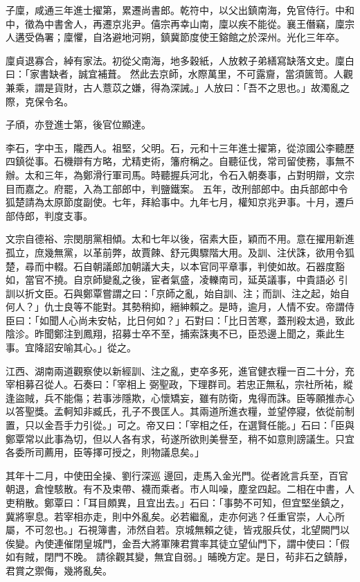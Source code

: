 \begin{pinyinscope}
 子廩，咸通三年進士擢第，累遷尚書郎。乾符中，以父出鎮南海，免官侍行。中和中，徵為中書舍人，再遷京兆尹。僖宗再幸山南，廩以疾不能從。襄王僭竊，廩宗人遘受偽署；廩懼，自洛避地河朔，鎮冀節度使王鎔館之於深州。光化三年卒。



 廩貞退寡合，綽有家法。初從父南海，地多穀紙，人放敕子弟繕寫缺落文史。廩白曰：「家書缺者，誠宜補葺。
 然此去京師，水際萬里，不可露齎，當須篋笥。人觀兼乘，謂是貨財，古人薏苡之嫌，得為深誡。」人放曰：「吾不之思也。」故濁亂之際，克保令名。



 子頎，亦登進士第，後官位顯達。



 李石，字中玉，隴西人。祖堅，父明。石，元和十三年進士擢第，從涼國公李聽歷四鎮從事。石機辯有方略，尤精吏術，籓府稱之。自聽征伐，常司留使務，事無不辦。太和三年，為鄭滑行軍司馬。時聽握兵河北，令石入朝奏事，占對明辯，文宗目而嘉之。府罷，入為工部郎中，判鹽鐵案。
 五年，改刑部郎中。由兵部郎中令狐楚請為太原節度副使。七年，拜給事中。九年七月，權知京兆尹事。十月，遷戶部侍郎，判度支事。



 文宗自德裕、宗閔朋黨相傾。太和七年以後，宿素大臣，穎而不用。意在擢用新進孤立，庶幾無黨，以革前弊，故賈餗、舒元輿驟階大用。及訓、注伏誅，欲用令狐楚，尋而中輟。石自朝議郎加朝議大夫，以本官同平章事，判使如故。石器度豁如，當官不撓。自京師變亂之後，宦者氣盛，凌轢南司，延英議事，中貴語必
 引訓以折文臣。石與鄭覃嘗謂之曰：「京師之亂，始自訓、注；而訓、注之起，始自何人？」仇士良等不能對。其勢稍抑，縉紳賴之。是時，逾月，人情不安。帝謂侍臣曰：「如聞人心尚未安帖，比日何如？」石對曰：「比日苦寒，蓋刑殺太過，致此陰沴。昨聞鄭注到鳳翔，招募士卒不至，捕索誅夷不已，臣恐邊上聞之，乘此生事。宜降詔安喻其心。」從之。



 江西、湖南兩道觀察使以新經訓、注之亂，吏卒多死，進官健衣糧一百二十分，充宰相募召從人。石奏曰：「宰相上
 弼聖政，下理群司。若忠正無私，宗社所祐，縱逢盜賊，兵不能傷；若事涉隱欺，心懷矯妄，雖有防衛，鬼得而誅。臣等願推赤心以答聖獎。孟軻知非臧氏，孔子不畏匡人。其兩道所進衣糧，並望停寢，依從前制置，只以金吾手力引從。」可之。帝又曰：「宰相之任，在選賢任能。」石曰：「臣與鄭覃常以此事為切，但以人各有求，茍遂所欲則美譽至，稍不如意則謗議生。只宜各委所司薦用，臣等擇可授之，則物議息矣。」



 其年十二月，中使田全操、劉行深巡
 邊回，走馬入金光門。從者訛言兵至，百官朝退，倉惶駭散。有不及束帶、襪而乘者。市人叫噪，塵坌四起。二相在中書，人吏稍散。鄭覃曰：「耳目頗異，且宜出去。」石曰：「事勢不可知，但宜堅坐鎮之，冀將寧息。若宰相亦走，則中外亂矣。必若繼亂，走亦何逃？任重官崇，人心所屬，不可忽也。」石視簿書，沛然自若。京城無賴之徒，皆戎服兵仗，北望闕門以俟變。內使連催閉皇城門，金吾大將軍陳君賞率其徒立望仙門下，謂中使曰：「假如有賊，閉門不晚。
 請徐觀其變，無宜自弱。」晡晚方定。是日，茍非石之鎮靜，君賞之禦侮，幾將亂矣。




\end{pinyinscope}
